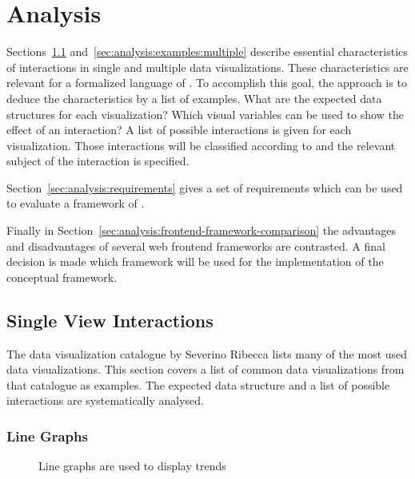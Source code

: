 \chapter{Analysis}\label{sec:analysis}
Sections~\ref{sec:analysis:examples:single} and~\ref{sec:analysis:examples:multiple} describe essential characteristics of interactions in single and multiple data visualizations.
These characteristics are relevant for a formalized language of \cmvs{}.
To accomplish this goal, the approach is to deduce the characteristics by a list of examples.
What are the expected data structures for each visualization?
Which visual variables can be used to show the effect of an interaction?
A list of possible interactions is given for each visualization.
Those interactions will be classified according to \textcite{Yi2007} and the relevant subject of the interaction is specified.

Section~\ref{sec:analysis:requirements} gives a set of requirements which can be used to evaluate a framework of \cmvs{}.

Finally in Section~\ref{sec:analysis:frontend-framework-comparison} the advantages and disadvantages of several web frontend frameworks are contrasted.
A final decision is made which framework will be used for the implementation of the conceptual framework.

\section{Single View Interactions}\label{sec:analysis:examples:single}

The data visualization catalogue by Severino Ribecca lists many of the most used data visualizations\cite{VisualizationCatalogue2017}.
This section covers a list of common data visualizations from that catalogue as examples.
The expected data structure and a list of possible interactions are systematically analysed.

\subsection{Line Graphs}
\begin{figure}
  \caption{Line graphs are used to display trends}
  \label{fig:analysis:line-graphs}
  \begin{center}
    \qquad
  \end{center}
\end{figure}

